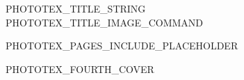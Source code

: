 \documentclass[11pt, a4paper, twoside, openright]{book}
\begin{document}
\pagestyle{empty}

\begin{titlepage}
  \hspace{0pt}
  \vfill%
  \begin{center}
    {\fontsize{PHOTOTEX_TITLE_FONT_SIZE}{PHOTOTEX_TITLE_LEADING_SIZE}\selectfont
      PHOTOTEX_TITLE_STRING}\\[3em]
    PHOTOTEX_TITLE_IMAGE_COMMAND
  \end{center}
  \vfill%
  \hspace{0pt}
\end{titlepage}
\newpage\null\thispagestyle{empty}\newpage%

PHOTOTEX_PAGES_INCLUDE_PLACEHOLDER

\newcommand*\cleartoleftpage{%
  \clearpage
  \ifodd\value{page}\hbox{}\newpage\fi
}

\cleartoleftpage%
\begin{center}
  {\Huge PHOTOTEX_FOURTH_COVER}
\end{center}

\end{document}
